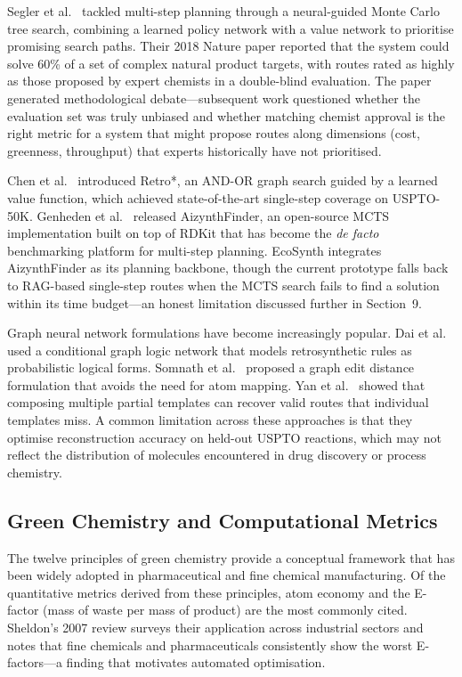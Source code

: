 \documentclass[12pt,a4paper]{article}
\begin{document}
Segler et al.~\cite{segler2018mcts} tackled multi-step planning through a
neural-guided Monte Carlo tree search, combining a learned policy network with
a value network to prioritise promising search paths. Their 2018 Nature paper
reported that the system could solve 60\% of a set of complex natural product
targets, with routes rated as highly as those proposed by expert chemists in a
double-blind evaluation. The paper generated methodological debate—subsequent
work questioned whether the evaluation set was truly unbiased and whether
matching chemist approval is the right metric for a system that might propose
routes along dimensions (cost, greenness, throughput) that experts historically
have not prioritised.

Chen et al.~\cite{chen2020retro} introduced Retro*, an AND-OR graph search
guided by a learned value function, which achieved state-of-the-art
single-step coverage on USPTO-50K. Genheden et al.~\cite{genheden2020aizynthfinder}
released AizynthFinder, an open-source MCTS implementation built on top of
RDKit \cite{landrum2006rdkit} that has become the \emph{de facto} benchmarking
platform for multi-step planning. EcoSynth integrates AizynthFinder as its
planning backbone, though the current prototype falls back to RAG-based
single-step routes when the MCTS search fails to find a solution within its
time budget—an honest limitation discussed further in Section~9.

Graph neural network formulations have become increasingly popular.
Dai et al.~\cite{dai2019retrosynthesis} used a conditional graph logic network
that models retrosynthetic rules as probabilistic logical forms. Somnath
et al.~\cite{somnath2021learning} proposed a graph edit distance formulation
that avoids the need for atom mapping. Yan et al.~\cite{yan2022retrocomposer}
showed that composing multiple partial templates can recover valid routes that
individual templates miss. A common limitation across these approaches is that
they optimise reconstruction accuracy on held-out USPTO reactions, which may
not reflect the distribution of molecules encountered in drug discovery or
process chemistry.

\subsection{Green Chemistry and Computational Metrics}

The twelve principles of green chemistry \cite{anastas1998greenchemistry}
provide a conceptual framework that has been widely adopted in pharmaceutical
and fine chemical manufacturing. Of the quantitative metrics derived from these
principles, atom economy \cite{sheldon2007efactor} and the E-factor (mass of
waste per mass of product) are the most commonly cited. Sheldon's 2007 review
\cite{sheldon2007efactor} surveys their application across industrial sectors
and notes that fine chemicals and pharmaceuticals consistently show the worst
E-factors—a finding that motivates automated optimisation.
\end{document}
